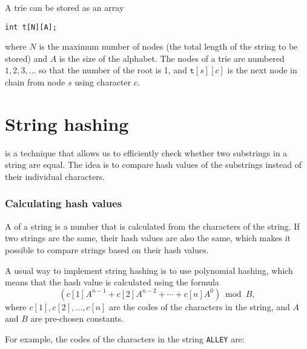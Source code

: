 A trie can be stored as an array
\begin{lstlisting}
int t[N][A];
\end{lstlisting}
where $N$ is the maximum number of nodes
(the total length of the string to be stored)
and $A$ is the size of the alphabet.
The nodes of a trie are numbered
$1,2,3,\ldots$ so that the number of the root is 1,
and $\texttt{t}[s][c]$ is the next node in chain
from node $s$ using character $c$.

\section{String hashing}


 is a technique that
allows us to efficiently check whether two
substrings in a string are equal.
The idea is to compare hash values of the
substrings instead of their individual characters.

\subsubsection*{Calculating hash values}


A  of a string is
a number that is calculated from the characters
of the string.
If two strings are the same,
their hash values are also the same,
which makes it possible to compare strings
based on their hash values.

A usual way to implement string hashing
is to use polynomial hashing, which means
that the hash value is calculated using the formula
\[(c[1] A^{n-1} + c[2] A^{n-2} + \cdots + c[n] A^0) \bmod B  ,\]
where $c[1],c[2],\ldots,c[n]$
are the codes of the characters in the string,
and $A$ and $B$ are pre-chosen constants.

For example, the codes of the characters
in the string \texttt{ALLEY} are:
\begin{center}
\end{center}

